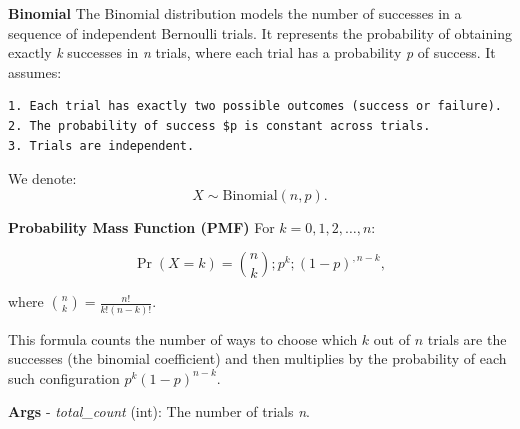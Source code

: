 \documentclass[
  letterpaper,
  DIV=11,
  numbers=noendperiod]{scrartcl}
\begin{document}
\textbf{Binomial} The Binomial distribution models the number of
successes in a sequence of independent Bernoulli trials. It represents
the probability of obtaining exactly \emph{k} successes in \emph{n}
trials, where each trial has a probability \emph{p} of success. It
assumes:

\begin{verbatim}
1. Each trial has exactly two possible outcomes (success or failure). 
2. The probability of success $p is constant across trials.
3. Trials are independent.
\end{verbatim}

We denote: \[
X \sim \mathrm{Binomial}(n, p).
\]

\textbf{Probability Mass Function (PMF)} For \(k = 0,1,2,\dots,n\):

\[
\Pr(X = k) = \binom{n}{k} ; p^k ; (1 - p)^{,n - k},
\]

where \(\binom{n}{k} = \frac{n!}{k!(n-k)!}\).

This formula counts the number of ways to choose which \(k\) out of
\(n\) trials are the successes (the binomial coefficient) and then
multiplies by the probability of each such configuration
\(p^k (1-p)^{n-k}\).

\textbf{Args} - \emph{total\_count} (int): The number of trials
\emph{n}.
\end{document}

